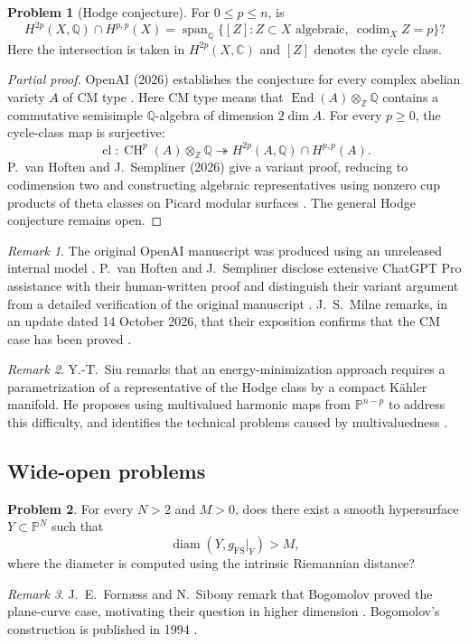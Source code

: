 \documentclass[11pt,reqno]{amsart}
\theoremstyle{definition}
\newtheorem{problem}{Problem}[section]
\theoremstyle{remark}
\newtheorem*{remark}{Remark}
\begin{document}
\begin{problem}[Hodge conjecture]\label{Siu-1.5}
For $0\leq p\leq n$, is
\[
H^{2p}(X,\mathbb Q)\cap H^{p,p}(X)
=\operatorname{span}_{\mathbb Q}\{[Z]:Z\subset X\text{ algebraic},\ \operatorname{codim}_X Z=p\}?
\]
Here the intersection is taken in $H^{2p}(X,\mathbb C)$ and $[Z]$ denotes the cycle class.
\end{problem}
\begin{proof}[Partial proof]
OpenAI (2026) establishes the conjecture for every complex abelian variety $A$ of CM type \cite[\S1]{SIU-OAI26}. Here CM type means that $\operatorname{End}(A)\otimes_{\mathbb Z}\mathbb Q$ contains a commutative semisimple $\mathbb Q$-algebra of dimension $2\dim A$. For every $p\geq0$, the cycle-class map is surjective:
\[
\operatorname{cl}:\operatorname{CH}^p(A)\otimes_{\mathbb Z}\mathbb Q
\twoheadrightarrow H^{2p}(A,\mathbb Q)\cap H^{p,p}(A).
\]
P.~van Hoften and J.~Sempliner (2026) give a variant proof, reducing to codimension two and constructing algebraic representatives using nonzero cup products of theta classes on Picard modular surfaces \cite[Theorem~I and \S1.2]{SIU-vHS26}. The general Hodge conjecture remains open.
\end{proof}
\begin{remark}
The original OpenAI manuscript was produced using an unreleased internal model \cite{SIU-OAI26,SIU-OAIRepo26}. P.~van Hoften and J.~Sempliner disclose extensive ChatGPT Pro assistance with their human-written proof and distinguish their variant argument from a detailed verification of the original manuscript \cite[\S\S1.3--1.4]{SIU-vHS26}. J.~S.~Milne remarks, in an update dated 14 October 2026, that their exposition confirms that the CM case has been proved \cite{SIU-Milne26}.
\end{remark}
\begin{remark}
Y.-T.~Siu remarks that an energy-minimization approach requires a parametrization of a representative of the Hodge class by a compact K\"ahler manifold. He proposes using multivalued harmonic maps from $\mathbb P^{n-p}$ to address this difficulty, and identifies the technical problems caused by multivaluedness \cite[\S1.5]{Siu2025}.
\end{remark}

\subsection{Wide-open problems}

\begin{problem}\label{FS-3.12}
For every $N>2$ and $M>0$, does there exist a smooth hypersurface $Y\subset\mathbb P^N$ such that
\[
\operatorname{diam}(Y,g_{\mathrm{FS}}|_Y)>M,
\]
where the diameter is computed using the intrinsic Riemannian distance?
\end{problem}
\begin{remark}
J.~E.~Forn\ae ss and N.~Sibony remark that Bogomolov proved the plane-curve case, motivating their question in higher dimension \cite[Question~3.12]{FS2001}. Bogomolov's construction is published in 1994 \cite{FS-Bogomolov}.
\end{remark}
\end{document}
